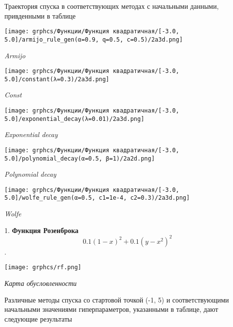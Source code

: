 \documentclass{article}
\begin{document}
Траектория спуска в соответствующих методах с начальными данными, привденными в таблице



\begin{center}
    \texttt{[image: grphcs/Функции/Функция квадратичная/[-3.0, 5.0]/armijo\_rule\_gen(α=0.9, q=0.5, c=0.5)/2a3d.png]}

    { \it Armijo}
\end{center}

\begin{center}
    \texttt{[image: grphcs/Функции/Функция квадратичная/[-3.0, 5.0]/constant(λ=0.3)/2a3d.png]}

    { \it Const}
\end{center}

\begin{center}
    \texttt{[image: grphcs/Функции/Функция квадратичная/[-3.0, 5.0]/exponential\_decay(λ=0.01)/2a3d.png]}

    { \it Exponential decay}
\end{center}

\begin{center}
    \texttt{[image: grphcs/Функции/Функция квадратичная/[-3.0, 5.0]/polynomial\_decay(α=0.5, β=1)/2a2d.png]}

    { \it Polynomial decay}
\end{center}

\begin{center}
    \texttt{[image: grphcs/Функции/Функция квадратичная/[-3.0, 5.0]/wolfe\_rule\_gen(α=0.5, c1=1e-4, c2=0.3)/2a3d.png]}

    { \it Wolfe}
\end{center}

\begin{enumerate}
    1. { \bf Функция Розенброка }
    $$ 0.1(1 - x)^2 + 0.1(y - x^2)^2 $$.
\end{enumerate}

\begin{center}
    \texttt{[image: grphcs/rf.png]}

    { \it Карта обусловленности}
\end{center}


Различные методы спуска со стартовой точкой (-1, 5) и соответствующими начальными значениями гиперпараметров, указанными в таблице, дают следующие результаты
\end{document}
